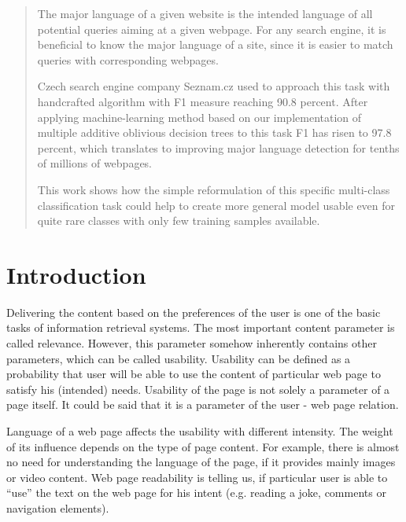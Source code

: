\documentclass{acm_proc_article-sp}
\begin{document}
\maketitle
\begin{abstract}
The major language of a given website is the intended language of all potential queries aiming at a given webpage.
For any search engine, it is beneficial to know the major language of a site, since it is easier to match
queries with corresponding webpages.

Czech search engine company Seznam.cz used to approach this task with handcrafted algorithm with F1 measure reaching
90.8 percent. After applying machine-learning method based on our implementation of multiple additive oblivious decision trees
to this task F1 has risen to 97.8 percent, which translates to improving major language detection for tenths of millions of webpages.

This work shows how the simple reformulation of this specific multi-class classification task could help
to create more general model usable even for quite rare classes with only few training samples available.


\end{abstract}

\section{Introduction}
  Delivering the content based on the preferences of the user is one of the basic tasks of information retrieval systems.
  The most important content parameter is called relevance. 
  However, this parameter somehow inherently contains other parameters, which can be called usability.
  Usability can be defined as a probability that user will be able to use the content of particular 
  web page to satisfy his (intended) needs.
  Usability of the page is not solely a parameter of a page itself.
  It could be said that it is a parameter of the user - web page relation.

  Language of a web page affects the usability with different intensity. 
  The weight of its influence depends on the type of page content.
  For example, there is almost no need for understanding the language of the page, if it provides mainly images or video content.
  Web page readability is telling us, if particular user is able to
  ``use'' the text on the web page for his intent (e.g. reading a joke, comments or navigation elements).
 
\end{document}
